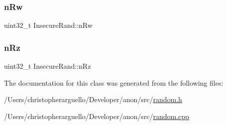 \mbox{\label{class_insecure_rand_a0baa5d4f04bcb55d1595bf79d8c24462}} 
\subsubsection{\texorpdfstring{n\+Rw}{nRw}}
{\footnotesize\ttfamily uint32\+\_\+t Insecure\+Rand\+::n\+Rw\hspace{0.3cm}{\ttfamily [private]}}

\mbox{\label{class_insecure_rand_a576e38fb46fbdebc9d6daeb546c36113}} 
\subsubsection{\texorpdfstring{n\+Rz}{nRz}}
{\footnotesize\ttfamily uint32\+\_\+t Insecure\+Rand\+::n\+Rz\hspace{0.3cm}{\ttfamily [private]}}



The documentation for this class was generated from the following files\+:\begin{DoxyCompactItemize}
\item 
/\+Users/christopherarguello/\+Developer/anon/src/\mbox{\hyperlink{random_8h}{random.\+h}}\item 
/\+Users/christopherarguello/\+Developer/anon/src/\mbox{\hyperlink{random_8cpp}{random.\+cpp}}\end{DoxyCompactItemize}
